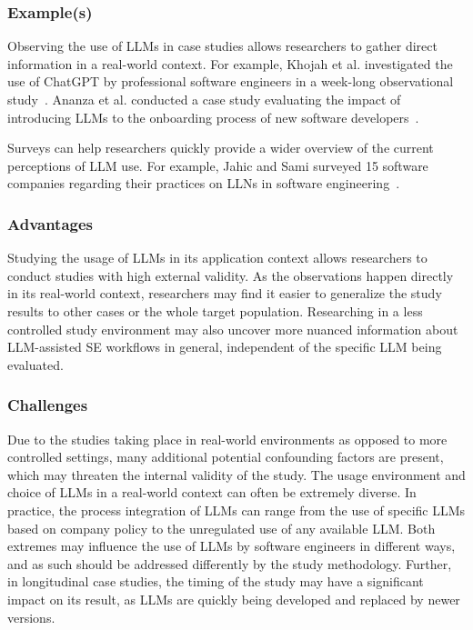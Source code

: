 \documentclass[11pt]{article}
\begin{document}
\subsubsection{Example(s)}

Observing the use of LLMs in case studies allows researchers to gather direct information in a real-world context.
For example, Khojah et al. investigated the use of ChatGPT by professional software engineers in a week-long observational study~\cite{DBLP:journals/pacmse/KhojahM0N24}.
Ananza et al. conducted a case study evaluating the impact of introducing LLMs to the onboarding process of new software developers~\cite{DBLP:conf/csee/AzanzaPIG24}.

Surveys can help researchers quickly provide a wider overview of the current perceptions of LLM use.
For example, Jahic and Sami surveyed 15 software companies regarding their practices on LLNs in software engineering~\cite{DBLP:conf/icsa/JahicS24}.

\subsubsection{Advantages}

Studying the usage of LLMs in its application context allows researchers to conduct studies with high external validity.
As the observations happen directly in its real-world context, researchers may find it easier to generalize the study results to other cases or the whole target population.
Researching in a less controlled study environment may also uncover more nuanced information about LLM-assisted SE workflows in general, independent of the specific LLM being evaluated.

\subsubsection{Challenges}

Due to the studies taking place in real-world environments as opposed to more controlled settings, many additional potential confounding factors are present, which may threaten the internal validity of the study.
The usage environment and choice of LLMs in a real-world context can often be extremely diverse.
In practice, the process integration of LLMs can range from the use of specific LLMs based on company policy to the unregulated use of any available LLM. 
Both extremes may influence the use of LLMs by software engineers in different ways, and as such should be addressed differently by the study methodology.
Further, in longitudinal case studies, the timing of the study may have a significant impact on its result, as LLMs are quickly being developed and replaced by newer versions.
\end{document}
